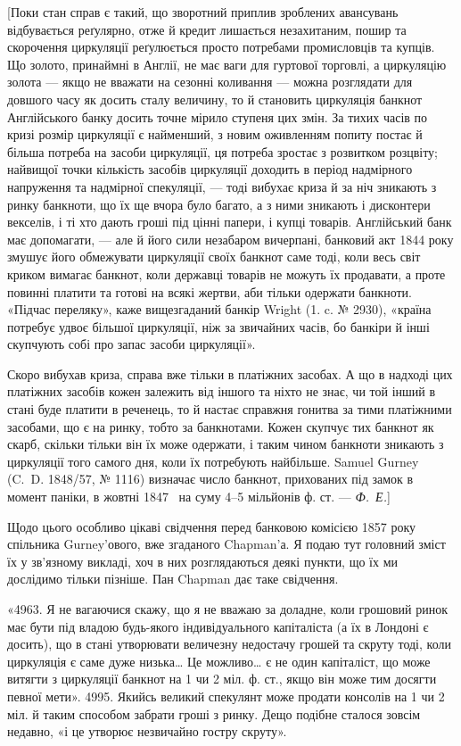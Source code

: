 
[Поки стан справ є такий, що зворотний приплив зроблених авансувань
відбувається реґулярно, отже й кредит лишається незахитаним, пошир та
скорочення циркуляції реґулюється просто потребами промисловців та купців. Що
золото, принаймні в Англії, не має ваги для гуртової торговлі, а циркуляцію
золота — якщо не вважати на сезонні коливання — можна розглядати для довшого
часу як досить сталу величину, то й становить циркуляція банкнот Англійського
банку досить точне мірило ступеня цих змін. За тихих часів по кризі розмір
циркуляції є найменший, з новим оживленням попиту постає й більша потреба
на засоби циркуляції, ця потреба зростає з розвитком розцвіту; найвищої точки
кількість засобів циркуляції доходить в період надмірного напруження та надмірної
спекуляції, — тоді вибухає криза й за ніч зникають з ринку банкноти,
що їх ще вчора було багато, а з ними зникають і дисконтери векселів, і ті хто
дають гроші під цінні папери, і купці товарів. Англійський банк має допомагати,
— але й його сили незабаром вичерпані, банковий акт 1844 року змушує
його обмежувати циркуляції своїх банкнот саме тоді, коли весь світ криком
вимагає банкнот, коли державці товарів не можуть їх продавати, а проте повинні
платити та готові на всякі жертви, аби тільки одержати банкноти. «Підчас
переляку», каже вищезгаданий банкір Wright (1. c. № 2930), «країна потребує
удвоє більшої циркуляції, ніж за звичайних часів, бо банкіри й інші скупчують
собі про запас засоби циркуляції».

Скоро вибухав криза, справа вже тільки в платіжних засобах. А що
в надході цих платіжних засобів кожен залежить від іншого та ніхто не знає,
чи той інший в стані буде платити в реченець, то й настає справжня гонитва
за тими платіжними засобами, що є на ринку, тобто за банкнотами. Кожен
скупчує тих банкнот як скарб, скільки тільки він їх може одержати, і таким
чином банкноти зникають з циркуляції того самого дня, коли їх потребують
найбільше. Samuel Gurney (C.~D. 1848/57, № 1116) визначає число банкнот,
прихованих під замок в момент паніки, в жовтні 1847~ на суму 4--5 мільйонів
ф. ст. — \emph{Ф.~Е.}]

Щодо цього особливо цікаві свідчення перед банковою комісією 1857 року
спільника Gurney’ового, вже згаданого Chapman’а. Я подаю тут головний
зміст їх у зв’язному викладі, хоч в них розглядаються деякі пункти, що їх ми
дослідимо тільки пізніше. Пан Chapman дає таке свідчення.

«4963. Я не вагаючися скажу, що я не вважаю за доладне, коли грошовий
ринок має бути під владою будь-якого індивідуального капіталіста (а їх
в Лондоні є досить), що в стані утворювати величезну недостачу грошей та скруту
тоді, коли циркуляція є саме дуже низька\dots{} Це можливо\dots{} є не один капіталіст,
що може витягти з циркуляції банкнот на 1 чи 2 міл. ф. ст., якщо він
може тим досягти певної мети». 4995. Якийсь великий спекулянт може продати
консолів на 1 чи 2 міл. й таким способом забрати гроші з ринку. Дещо подібне
сталося зовсім недавно, «і це утворює незвичайно гостру скруту».

